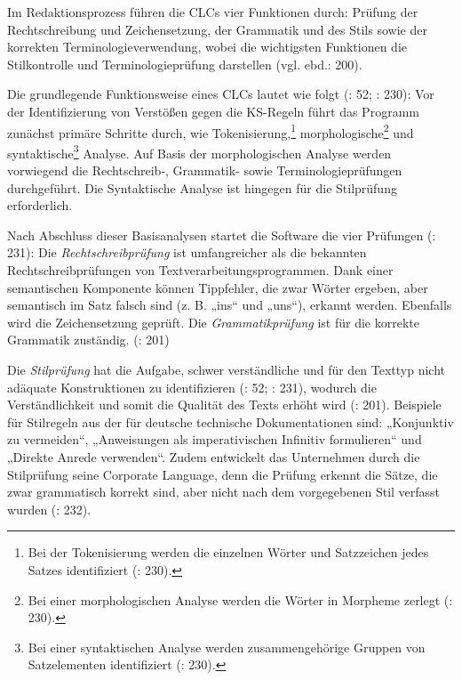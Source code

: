 Im Redaktionsprozess führen die CLCs vier Funktionen durch: Prüfung der Rechtschreibung und Zeichensetzung, der Grammatik und des Stils sowie der korrekten Terminologieverwendung, wobei die wichtigsten Funktionen die Stilkontrolle und Terminologieprüfung darstellen (vgl. ebd.: 200).

Die grundlegende Funktionsweise eines CLCs lautet wie folgt (\citealt{Siegel2013}: 52; \citealt{DrewerZiegler2014}: 230): Vor der Identifizierung von Verstößen gegen die KS-Regeln führt das Programm zunächst primäre Schritte durch, wie Tokenisierung,\footnote{{{{Bei der Tokenisierung werden die einzelnen Wörter und Satzzeichen jedes Satzes identifiziert (\citealt{DrewerZiegler2014}: 230).}}}} morphologische\footnote{{{{Bei einer morphologischen Analyse werden die Wörter in Morpheme zerlegt (\citealt{DrewerZiegler2014}: 230).}}}} und syntaktische\footnote{{{{Bei einer syntaktischen Analyse werden zusammengehörige Gruppen von Satzelementen identifiziert (\citealt{DrewerZiegler2014}: 230).}}}} Analyse. Auf Basis der morphologischen Analyse werden vorwiegend die Rechtschreib-, Grammatik- sowie Terminologieprüfungen durchgeführt. Die Syntaktische Analyse ist hingegen für die Stilprüfung erforderlich.

Nach Abschluss dieser Basisanalysen startet die Software die vier Prüfungen (\citealt{DrewerZiegler2014}: 231): Die \textit{Rechtschreibprüfung} ist umfangreicher als die bekannten Rechtschreibprüfungen von Textverarbeitungsprogrammen. Dank einer semantischen Komponente können Tippfehler, die zwar Wörter ergeben, aber semantisch im Satz falsch sind (z. B. „ins“ und „uns“), erkannt werden. Ebenfalls wird die Zeichensetzung geprüft. Die \textit{Grammatikprüfung} ist für die korrekte Grammatik zuständig. (\citealt{DrewerSchmitz2017}: 201)

Die \textit{Stilprüfung} hat die Aufgabe, schwer verständliche und für den Texttyp nicht adäquate Konstruktionen zu identifizieren (\citealt{Siegel2013}: 52; \citealt{DrewerZiegler2014}: 231), wodurch die Verständlichkeit und somit die Qualität des Texts erhöht wird (\citealt{DrewerSchmitz2017}: 201). Beispiele für Stilregeln aus der \citet{tekom2013} für deutsche technische Dokumentationen sind: „Konjunktiv zu vermeiden“, „Anweisungen als imperativischen Infinitiv formulieren“ und „Direkte Anrede verwenden“. Zudem entwickelt das Unternehmen durch die Stilprüfung seine Corporate Language, denn die Prüfung erkennt die Sätze, die zwar grammatisch korrekt sind, aber nicht nach dem vorgegebenen Stil verfasst wurden (\citealt{DrewerZiegler2014}: 232).

